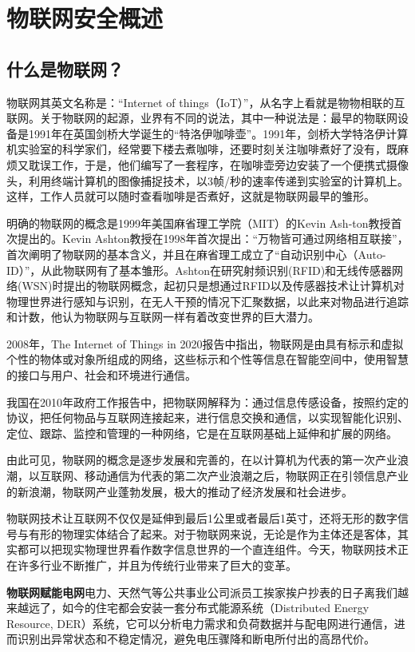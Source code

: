 \section{物联网安全概述}
\label{xdtz}

\subsection{什么是物联网？}
\label{IOT}

物联网其英文名称是：“Internet of things（IoT）”，从名字上看就是物物相联的互联网。关于物联网的起源，业界有不同的说法，其中一种说法是：最早的物联网设备是1991年在英国剑桥大学诞生的“特洛伊咖啡壶”。1991年，剑桥大学特洛伊计算机实验室的科学家们，经常要下楼去煮咖啡，还要时刻关注咖啡煮好了没有，既麻烦又耽误工作，于是，他们编写了一套程序，在咖啡壶旁边安装了一个便携式摄像头，利用终端计算机的图像捕捉技术，以3帧/秒的速率传递到实验室的计算机上。这样，工作人员就可以随时查看咖啡是否煮好，这就是物联网最早的雏形。

明确的物联网的概念是1999年美国麻省理工学院（MIT）的Kevin Ash-ton教授首次提出的。Kevin Ashton教授在1998年首次提出：“万物皆可通过网络相互联接”，首次阐明了物联网的基本含义，并且在麻省理工成立了“自动识别中心（Auto-ID）”，从此物联网有了基本雏形。Ashton在研究射频识别(RFID)和无线传感器网络(WSN)时提出的物联网概念，起初只是想通过RFID以及传感器技术让计算机对物理世界进行感知与识别，在无人干预的情况下汇聚数据，以此来对物品进行追踪和计数，他认为物联网与互联网一样有着改变世界的巨大潜力。


2008年，The Internet of Things in 2020报告中指出，物联网是由具有标示和虚拟个性的物体或对象所组成的网络，这些标示和个性等信息在智能空间中，使用智慧的接口与用户、社会和环境进行通信。

我国在2010年政府工作报告中，把物联网解释为：通过信息传感设备，按照约定的协议，把任何物品与互联网连接起来，进行信息交换和通信，以实现智能化识别、定位、跟踪、监控和管理的一种网络，它是在互联网基础上延伸和扩展的网络。

由此可见，物联网的概念是逐步发展和完善的，在以计算机为代表的第一次产业浪潮，以互联网、移动通信为代表的第二次产业浪潮之后，物联网正在引领信息产业的新浪潮，物联网产业蓬勃发展，极大的推动了经济发展和社会进步。


物联网技术让互联网不仅仅是延伸到最后1公里或者最后1英寸，还将无形的数字信号与有形的物理实体结合了起来。对于物联网来说，无论是作为主体还是客体，其实都可以把现实物理世界看作数字信息世界的一个直连组件。今天，物联网技术正在许多行业不断推广，并且为传统行业带来了巨大的变革。 

\textcolor{myblue}{\textbf{物联网赋能电网}}\quad 电力、天然气等公共事业公司派员工挨家挨户抄表的日子离我们越来越远了，如今的住宅都会安装一套分布式能源系统（Distributed Energy Resource, DER）系统，它可以分析电力需求和负荷数据并与配电网进行通信，进而识别出异常状态和不稳定情况，避免电压骤降和断电所付出的高昂代价。 

